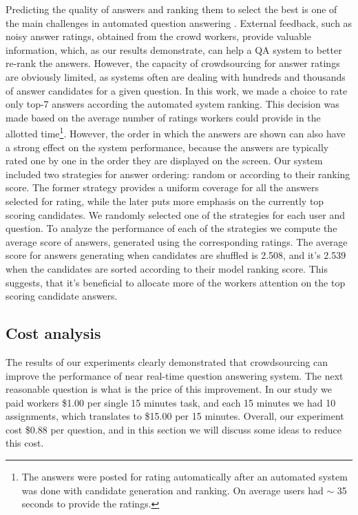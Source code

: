Predicting the quality of answers and ranking them to select the best is one of the main challenges in automated question answering \cite{surdeanu2011learning}.
External feedback, such as noisy answer ratings, obtained from the crowd workers, provide valuable information, which, as our results demonstrate, can help a QA system to better re-rank the answers.
However, the capacity of crowdsourcing for answer ratings are obviously limited, as systems often are dealing with hundreds and thousands of answer candidates for a given question.
In this work, we made a choice to rate only top-7 answers according the automated system ranking.
This decision was made based on the average number of ratings workers could provide in the allotted time\footnote{The answers were posted for rating automatically after an automated system was done with candidate generation and ranking. On average users had $\sim$ 35 seconds to provide the ratings.}.
However, the order in which the answers are shown can also have a strong effect on the system performance, because the answers are typically rated one by one in the order they are displayed on the screen.
Our system included two strategies for answer ordering: random or according to their ranking score.
The former strategy provides a uniform coverage for all the answers selected for rating, while the later puts more emphasis on the currently top scoring candidates.
We randomly selected one of the strategies for each user and question.
To analyze the performance of each of the strategies we compute the average score of answers, generated using the corresponding ratings.
The average score for answers generating when candidates are shuffled is 2.508, and it's 2.539 when the candidates are sorted according to their model ranking score.
This suggests, that it's beneficial to allocate more of the workers attention on the top scoring candidate answers.

\subsection{Cost analysis}
\label{sec:analysis:cost}

The results of our experiments clearly demonstrated that crowdsourcing can improve the performance of near real-time question answering system.
The next reasonable question is what is the price of this improvement.
In our study we paid workers \$1.00 per single 15 minutes task, and each 15 minutes we had 10 assignments, which translates to \$15.00 per 15 minutes.
Overall, our experiment cost \$0.88 per question, and in this section we will discuss some ideas to reduce this cost.

